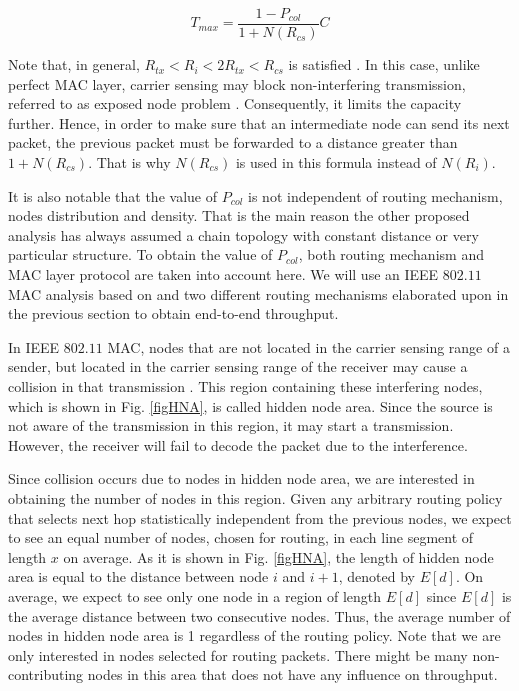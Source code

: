 \documentclass[12pt, draftclsnofoot, onecolumn]{IEEEtran}
\begin{document}
\begin{equation}
\label{eq::maxThrough}
T_{max} = \frac{1-P_{col}}{1+N(R_{cs}) }C
\end{equation}

Note that, in general, $R_{tx}<R_{i}<2R_{tx}<R_{cs}$  is 
satisfied \cite{ref13}. In this case, unlike perfect MAC layer, 
carrier sensing may block non-interfering transmission, referred to as exposed node problem \cite{ref17}. 
Consequently, it limits the capacity further. Hence, in order to 
make sure that an intermediate node can send its next packet, 
the previous packet must be forwarded to a distance greater than 
$1+N(R_{cs})$. That is why $N(R_{cs})$ is used in this formula 
instead of $N(R_i)$.

It is also notable that the value of $P_{col}$ is not independent of 
routing mechanism, nodes distribution and density. That is the main 
reason the other proposed analysis has always assumed a chain 
topology with constant distance or very particular structure. To obtain 
the value of $P_{col}$, both routing mechanism and MAC layer protocol
are taken into account here. We will use an IEEE $802.11$ MAC analysis 
based on \cite{ref1} and two different routing mechanisms elaborated 
upon in the previous section to obtain end-to-end throughput.

In IEEE $802.11$ MAC, nodes that are not located in the carrier sensing 
range of a sender, but located in the carrier sensing range of the receiver 
may cause a collision in that transmission \cite{ref1}. This region containing these 
interfering nodes, which is shown in Fig. \ref{figHNA}, is called hidden 
node area. Since the source is not aware of the transmission in this 
region, it may start a transmission. However, the receiver will fail to 
decode the packet due to the interference.

Since collision occurs due to nodes in hidden node area, we are 
interested in obtaining the number of nodes in this region. Given any 
arbitrary routing policy that selects next hop statistically independent 
from the previous nodes, we expect to see an equal number of nodes, 
chosen for routing, in each line segment of length $x$ on average. As 
it is shown in Fig. \ref{figHNA}, the length of hidden node area is equal 
to the distance between node $i$ and $i+1$, denoted by $E[d]$.
On average, we expect to see only one node in a region of 
length $E[d]$ since $E[d]$ is the average distance between 
two consecutive nodes. Thus, the average number of nodes 
in hidden node area is 1 regardless of the routing policy. 
Note that we are only interested in nodes selected for 
routing packets. There might be many 
non-contributing nodes in this area that does not have 
any influence on throughput.
\end{document}
